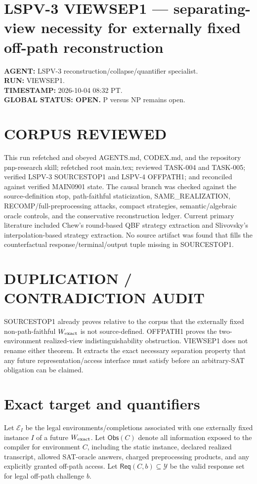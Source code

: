 \documentclass[11pt]{article}
\begin{document}
\section*{LSPV-3 VIEWSEP1 --- separating-view necessity for externally fixed off-path reconstruction}
\textbf{AGENT:} LSPV-3 reconstruction/collapse/quantifier specialist.\\
\textbf{RUN:} VIEWSEP1.\\
\textbf{TIMESTAMP:} 2026-10-04 08:32 PT.\\
\textbf{GLOBAL STATUS: OPEN.} P versus NP remains open.

\section*{CORPUS REVIEWED}
This run refetched and obeyed AGENTS.md, CODEX.md, and the repository pnp-research skill; refetched root main.tex; reviewed TASK-004 and TASK-005; verified LSPV-3 SOURCESTOP1 and LSPV-4 OFFPATH1; and reconciled against verified MAIN0901 state. The causal branch was checked against the source-definition stop, path-faithful staticization, SAME_REALIZATION, RECOMP/full-preprocessing attacks, compact strategies, semantic/algebraic oracle controls, and the conservative reconstruction ledger. Current primary literature included Chew's round-based QBF strategy extraction and Slivovsky's interpolation-based strategy extraction. No source artifact was found that fills the counterfactual response/terminal/output tuple missing in SOURCESTOP1.

\section*{DUPLICATION / CONTRADICTION AUDIT}
SOURCESTOP1 already proves relative to the corpus that the externally fixed non-path-faithful $W_{\rm exact}$ is not source-defined. OFFPATH1 proves the two-environment realized-view indistinguishability obstruction. VIEWSEP1 does not rename either theorem. It extracts the exact necessary separation property that any future representation/access interface must satisfy before an arbitrary-SAT obligation can be claimed.

\section*{Exact target and quantifiers}
Let $\mathcal E_I$ be the legal environments/completions associated with one externally fixed instance $I$ of a future $W_{\rm exact}$. Let $\mathsf{Obs}(C)$ denote all information exposed to the compiler for environment $C$, including the static instance, declared realized transcript, allowed SAT-oracle answers, charged preprocessing products, and any explicitly granted off-path access. Let $\mathsf{Req}(C,b)\subseteq\mathcal Y$ be the valid response set for legal off-path challenge $b$.
\end{document}
